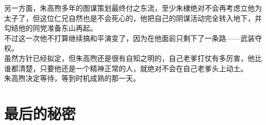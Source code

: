 \begin{multicols}{\theparacolNo}
另一方面，朱高煦多年的图谋策划最终付之东流，至少朱棣绝对不会再考虑立他为太子了，但这位仁兄自然也是不会死心的，他把自己的阴谋活动完全转入地下，并勾结他的同党准备东山再起。\\

不过这一次他不打算继续搞和平演变了，因为在他面前只剩下了一条路——武装夺权。\\

虽然方针已经拟定，但朱高煦还是很有自知之明的，自己老爹打仗有多厉害，他比谁都清楚，只要他还是一个精神正常的人，就绝对不会在自己老爹头上动土。\\

朱高煦决定等待，等到时机成熟的那一天。\\
\ifnum{}
	\end{multicols}
\fi
\newpage
\section{最后的秘密}
\ifnum{}
